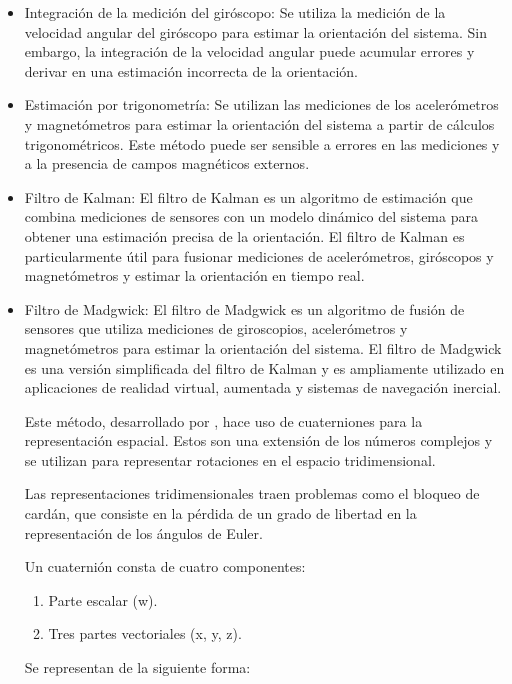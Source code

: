 \begin{itemize}
    \item Integración de la medición del giróscopo: Se utiliza la medición de la velocidad angular del giróscopo para estimar la orientación del sistema. Sin embargo, la integración de la velocidad angular puede acumular errores y derivar en una estimación incorrecta de la orientación.
    \item Estimación por trigonometría: Se utilizan las mediciones de los acelerómetros y magnetómetros para estimar la orientación del sistema a partir de cálculos trigonométricos. Este método puede ser sensible a errores en las mediciones y a la presencia de campos magnéticos externos.
	\item Filtro de Kalman: El filtro de Kalman es un algoritmo de estimación que combina mediciones de sensores con un modelo dinámico del sistema para obtener una estimación precisa de la orientación. El filtro de Kalman es particularmente útil para fusionar mediciones de acelerómetros, giróscopos y magnetómetros y estimar la orientación en tiempo real.
	
	\item Filtro de Madgwick: El filtro de Madgwick es un algoritmo de fusión de sensores que utiliza mediciones de giroscopios, acelerómetros y magnetómetros para estimar la orientación del sistema. El filtro de Madgwick es una versión simplificada del filtro de Kalman y es ampliamente utilizado en aplicaciones de realidad virtual, aumentada y sistemas de navegación inercial.
	
    Este método, desarrollado por \cite{madgwick2010efficient}, hace uso de cuaterniones para la representación espacial. Estos son una extensión de los números complejos y se utilizan para representar rotaciones en el espacio tridimensional.

    Las representaciones tridimensionales traen problemas como el bloqueo de cardán, que consiste en la pérdida de un grado de libertad en la representación de los ángulos de Euler.

    Un cuaternión consta de cuatro componentes:

    \begin{enumerate}
        \item Parte escalar (w).
        \item Tres partes vectoriales (x, y, z).
    \end{enumerate}

    Se representan de la siguiente forma:


\end{itemize}
